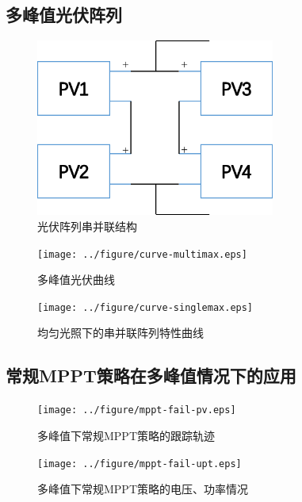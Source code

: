 \documentclass[a4paper,12pt]{article}
\begin{document}
    \subsection{多峰值光伏阵列} %
    \label{sub:多峰值光伏阵列}
    \begin{figure}[htbp]
        \centering
        \includegraphics[width=0.7\textwidth]{pvarray.png}
        \caption{光伏阵列串并联结构}
        \label{fig:pvarray}
    \end{figure}
    \begin{figure}[htbp]
        \centering
        \texttt{[image: ../figure/curve-multimax.eps]}
        \caption{多峰值光伏曲线}
        \label{fig:curve-multimax}
    \end{figure}
    \begin{figure}[htbp]
        \centering
        \texttt{[image: ../figure/curve-singlemax.eps]}
        \caption{均匀光照下的串并联阵列特性曲线}
        \label{fig:curve-singlemax}
    \end{figure}
    \subsection{常规MPPT策略在多峰值情况下的应用} %
    \label{sub:常规mppt策略在多峰值情况下的应用}
    \begin{figure}[htbp]
        \centering
        \texttt{[image: ../figure/mppt-fail-pv.eps]}
        \caption{多峰值下常规MPPT策略的跟踪轨迹}
        \label{fig:mppt-fail-pv}
    \end{figure}
    \begin{figure}[htbp]
        \centering
        \texttt{[image: ../figure/mppt-fail-upt.eps]}
        \caption{多峰值下常规MPPT策略的电压、功率情况}
        \label{fig:mppt-fail-upt}
    \end{figure}
\end{document}

